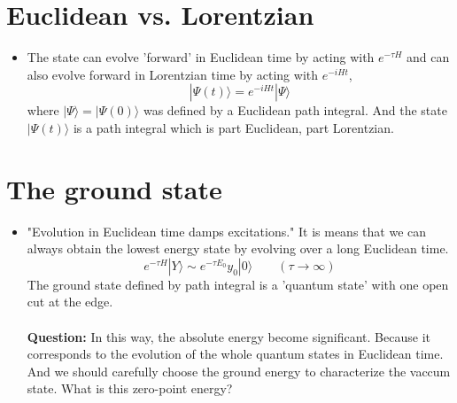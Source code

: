 \documentclass{article}
\def\beq{\begin{eqnarray}}
\def\eeq{\end{eqnarray}}
\def\beq{\begin{equation}}
\def\eeq{\end{equation}}
\begin{document}
\section{Euclidean vs. Lorentzian}
\begin{itemize}
\item{The state can evolve 'forward' in Euclidean time by acting with $e^{-\tau H}$} and can also evolve forward in Lorentzian time by acting with $e^{-iHt}$,
 \beq
  |\Psi(t)\rangle=e^{-iHt}|\Psi\rangle
 \eeq
 where $|\Psi\rangle=|\Psi(0)\rangle $ was defined by a Euclidean path integral. And the state $|\Psi(t)\rangle$ is a path integral which is part Euclidean, part Lorentzian.
\end{itemize}
\section{The ground state}
\begin{itemize}
\item{"Evolution in Euclidean time damps excitations." It is means that we can always obtain the lowest energy state by evolving over a long Euclidean time.
    \beq
     e^{-\tau H}|Y\rangle\sim e^{-\tau E_{0}}y_{0}|0\rangle   \qquad (\tau\rightarrow \infty)
    \eeq
    The ground state defined by path integral is a 'quantum state' with one open cut at the edge.
}\\~~\\
\textbf{Question:} In this way, the absolute energy become significant. Because it corresponds to the evolution of the whole quantum states in Euclidean time. And we should carefully choose the ground energy to characterize the vaccum state. What is this zero-point energy?
\end{itemize}
\end{document}
